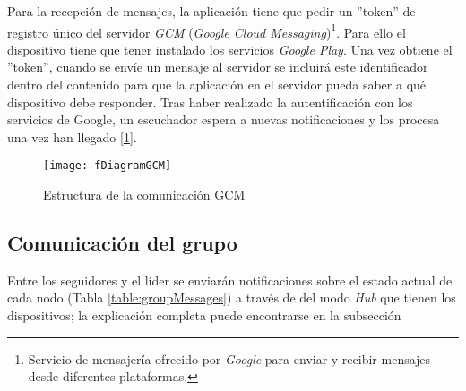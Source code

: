 Para la recepción de mensajes, la aplicación tiene que pedir un ''token'' de registro único del servidor \emph{GCM} (\emph{Google Cloud Messaging})\footnote{Servicio de mensajería ofrecido por \emph{Google} para enviar y recibir mensajes desde diferentes plataformas.}. Para ello el dispositivo tiene que tener instalado los servicios \emph{Google Play}. Una vez obtiene el ''token'', cuando se envíe un mensaje al servidor se incluirá este identificador dentro del contenido para que la aplicación en el servidor pueda saber a qué dispositivo debe responder. Tras haber realizado la autentificación con los servicios de Google, un escuchador espera a nuevas notificaciones y los procesa una vez han llegado [\ref{figure:DiagramGCM}].
\begin{figure}[h]
	\texttt{[image: fDiagramGCM]}
	\caption{Estructura de la comunicación GCM}
	\label{figure:DiagramGCM}
\end{figure}

\subsection{Comunicación del grupo}\label{ssection:comunicacion_grupo}
Entre los seguidores y el líder se enviarán notificaciones sobre el estado actual de cada nodo (Tabla \ref{table:groupMessages}) a través de del modo \emph{Hub} que tienen los dispositivos; la explicación completa puede encontrarse en la subsección %

